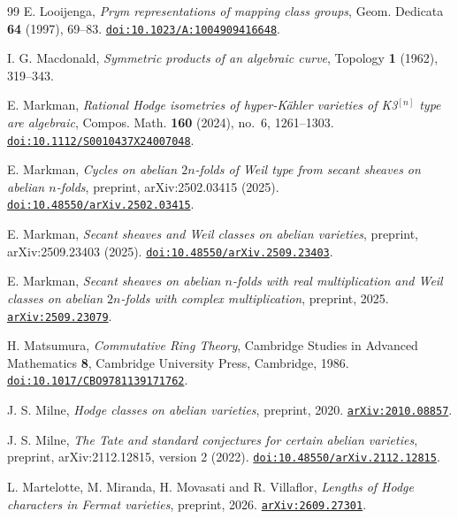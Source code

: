 \begin{thebibliography}{99}
E. Looijenga,
\emph{Prym representations of mapping class groups},
Geom. Dedicata \textbf{64} (1997), 69--83.
\href{https://doi.org/10.1023/A:1004909416648}{\texttt{doi:10.1023/A:1004909416648}}.

I. G. Macdonald,
\emph{Symmetric products of an algebraic curve},
Topology \textbf{1} (1962), 319--343.

E. Markman,
\emph{Rational Hodge isometries of hyper-K\"ahler varieties of K3$^{[n]}$
type are algebraic},
Compos. Math. \textbf{160} (2024), no.~6, 1261--1303.
\href{https://doi.org/10.1112/S0010437X24007048}{\texttt{doi:10.1112/S0010437X24007048}}.

E. Markman,
\emph{Cycles on abelian $2n$-folds of Weil type from secant sheaves on abelian
$n$-folds}, preprint, arXiv:2502.03415 (2025).
\href{https://doi.org/10.48550/arXiv.2502.03415}{\texttt{doi:10.48550/arXiv.2502.03415}}.

E. Markman,
\emph{Secant sheaves and Weil classes on abelian varieties},
preprint, arXiv:2509.23403 (2025).
\href{https://doi.org/10.48550/arXiv.2509.23403}{\texttt{doi:10.48550/arXiv.2509.23403}}.

E. Markman,
\emph{Secant sheaves on abelian $n$-folds with real multiplication and Weil
classes on abelian $2n$-folds with complex multiplication},
preprint, 2025.
\href{https://arxiv.org/abs/2509.23079}{\texttt{arXiv:2509.23079}}.

H. Matsumura,
\emph{Commutative Ring Theory},
Cambridge Studies in Advanced Mathematics \textbf{8},
Cambridge University Press, Cambridge, 1986.
\href{https://doi.org/10.1017/CBO9781139171762}{\texttt{doi:10.1017/CBO9781139171762}}.

J. S. Milne,
\emph{Hodge classes on abelian varieties},
preprint, 2020.
\href{https://arxiv.org/abs/2010.08857}{\texttt{arXiv:2010.08857}}.

J. S. Milne,
\emph{The Tate and standard conjectures for certain abelian varieties},
preprint, arXiv:2112.12815, version 2 (2022).
\href{https://doi.org/10.48550/arXiv.2112.12815}{\texttt{doi:10.48550/arXiv.2112.12815}}.

L. Martelotte, M. Miranda, H. Movasati and R. Villaflor,
\emph{Lengths of Hodge characters in Fermat varieties},
preprint, 2026.
\href{https://arxiv.org/abs/2609.27301}{\texttt{arXiv:2609.27301}}.


\end{thebibliography}
